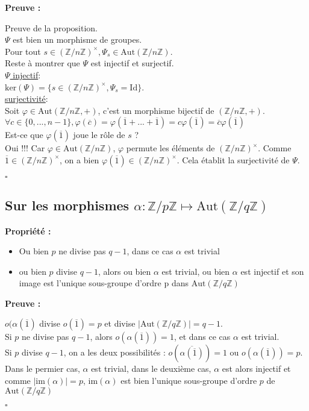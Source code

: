 \documentclass{report}
\renewenvironment{leftbar}{%
  \def\FrameCommand{\vrule width 0.4pt \hspace{10pt}}%
  \MakeFramed {\advance\hsize-\width \FrameRestore}}%
 {\endMakeFramed}%
\newenvironment{preuve}{\vspace*{0.5cm}
    \begin{leftbar}
    \noindent\textbf{Preuve :}\par}{
    \begin{flushright}
    $\square$
    \end{flushright}
    \end{leftbar}
}
\newenvironment{prop}{\begin{tcolorbox}[colframe= white]
    \textbf{Propriété :}
     \par}
    {\end{tcolorbox}}
\newcommand{\Z}{\mathbb{Z}}
\begin{document}
\begin{preuve}
    Preuve de la proposition.\\
    $\Psi$ est bien un morphisme de groupes.\\
    Pour tout $s\in(\Z/n\Z)^{\times}, \Psi_s \in\mathrm{Aut}(\Z/n\Z)$.\\
    Reste à montrer que $\Psi$ est injectif et surjectif.\\
    \underline{$\Psi$ injectif}:\\
    $\mathrm{ker}(\Psi) = \{s\in(\Z/n\Z)^{\times},\Psi_s = \mathrm{Id}\}$.\\
    \underline{surjectivité}:\\
    Soit $\varphi\in\mathrm{Aut}(\Z/n\Z,+)$, c'est un morphisme bijectif de $(\Z/n\Z,+)$.\\
    $\forall c\in\{0,...,n-1\}, \varphi(\overline{c}) = \varphi(\overline{1} + ... + \overline{1}) = c\varphi(\overline{1}) = \overline{c}\varphi(\overline{1})$\\
    Est-ce que $\varphi(\overline{1})$ joue le rôle de $s$ ?\\
    Oui !!! Car $\varphi \in\mathrm{Aut}(\Z/n\Z)$, $\varphi$ permute les éléments de $(\Z/n\Z)^{\times}$. Comme $\overline{1}\in(\Z/n\Z)^{\times}$, on a bien $\varphi(\overline{1})\in(\Z/n\Z)^{\times}$. Cela établit la surjectivité de $\Psi$.
\end{preuve}

\subsection{Sur les morphismes $\alpha : \Z/p\Z \mapsto \mathrm{Aut}(\Z/q\Z)$}

\begin{prop}
    \begin{itemize}
        \item Ou bien $p$ ne divise pas $q-1$, dans ce cas $\alpha$ est trivial 
        \item ou bien $p$ divise $q-1$, alors ou bien $\alpha$ est trivial, ou bien $\alpha$ est injectif et son image est l'unique sous-groupe d'ordre p dans $\mathrm{Aut}(\Z/q\Z)$
    \end{itemize}
\end{prop}

\begin{preuve}
    $o(\alpha(\overline{1})$ divise $o(\overline{1}) = p$ et divise $|\mathrm{Aut}(\Z/q\Z)| = q-1$.\\
    Si $p$ ne divise pas $q-1$, alors $o(\alpha(\overline{1})) = 1$, et dans ce cas $\alpha$ est trivial.\\
    Si $p$ divise $q-1$, on a les deux possibilités : $o(\overline{\alpha(\overline{1})}) = 1$ ou $o(\alpha(\overline{1})) = p$.\\
    Dans le permier cas, $\alpha$ est trivial, dans le deuxième cas, $\alpha$ est alors injectif et comme $|\mathrm{im}(\alpha)| = p$, $\mathrm{im}(\alpha)$ est bien l'unique sous-groupe d'ordre $p$ de $\mathrm{Aut}(\Z/q\Z)$
\end{preuve}
\end{document}
